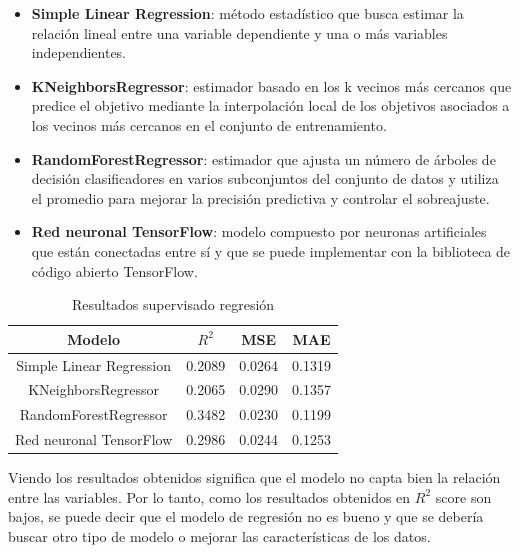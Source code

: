 \documentclass{wsdcr}
\begin{document}
\begin{itemize}
    \setlength\itemsep{0em}
    \item \textbf{Simple Linear Regression}: método estadístico que busca estimar la relación lineal entre una variable dependiente y una o más variables independientes.
    \item \textbf{KNeighborsRegressor}: estimador basado en los k vecinos más cercanos que predice el objetivo mediante la interpolación local de los objetivos asociados a los vecinos más cercanos en el conjunto de entrenamiento.
    \item \textbf{RandomForestRegressor}: estimador que ajusta un número de árboles de decisión clasificadores en varios subconjuntos del conjunto de datos y utiliza el promedio para mejorar la precisión predictiva y controlar el sobreajuste.
    \item \textbf{Red neuronal TensorFlow}: modelo compuesto por neuronas artificiales que están conectadas entre sí y que se puede implementar con la biblioteca de código abierto TensorFlow.
\end{itemize}

\vspace{5mm}
\begin{table}[H]
    \begin{center}
        \begin{tabular}{| c | c | c | c | }\hline
            Modelo                   & $R^{2}$ & MSE    & MAE    \\ \hline
            Simple Linear Regression & 0.2089  & 0.0264 & 0.1319 \\
            KNeighborsRegressor      & 0.2065  & 0.0290 & 0.1357 \\
            RandomForestRegressor    & 0.3482  & 0.0230 & 0.1199 \\
            Red neuronal TensorFlow  & 0.2986  & 0.0244 & 0.1253 \\ \hline
        \end{tabular}
        \caption{Resultados supervisado regresión}
        \label{tab:resultados supervisado regresion}
    \end{center}
\end{table}

Viendo los resultados obtenidos significa que el modelo no capta bien la relación entre las variables. Por lo tanto, como los resultados obtenidos en $R^{2}$ score son bajos, se puede decir que el modelo de regresión no es bueno y que se debería buscar otro tipo de modelo o mejorar las características de los datos.
\end{document}

